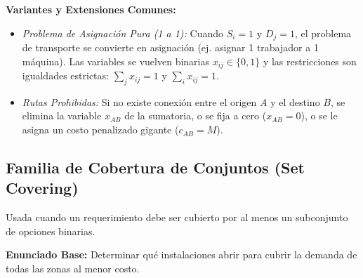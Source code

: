 \documentclass{article}
\begin{document}
	\textbf{Variantes y Extensiones Comunes:}
	\begin{itemize}
		\item \textit{Problema de Asignación Pura (1 a 1):} Cuando $S_i = 1$ y $D_j = 1$, el problema de transporte se convierte en asignación (ej. asignar 1 trabajador a 1 máquina). Las variables se vuelven binarias $x_{ij} \in \{0,1\}$ y las restricciones son igualdades estrictas: $\sum_{j} x_{ij} = 1$ y $\sum_{i} x_{ij} = 1$.
		\item \textit{Rutas Prohibidas:} Si no existe conexión entre el origen $A$ y el destino $B$, se elimina la variable $x_{AB}$ de la sumatoria, o se fija a cero ($x_{AB} = 0$), o se le asigna un costo penalizado gigante ($c_{AB} = M$).
	\end{itemize}
	
	\newpage
	
	\subsection{Familia de Cobertura de Conjuntos (Set Covering)}
	Usada cuando un requerimiento debe ser cubierto por al menos un subconjunto de opciones binarias.
	
	\textbf{Enunciado Base:} Determinar qué instalaciones abrir para cubrir la demanda de todas las zonas al menor costo.
	
\end{document}
